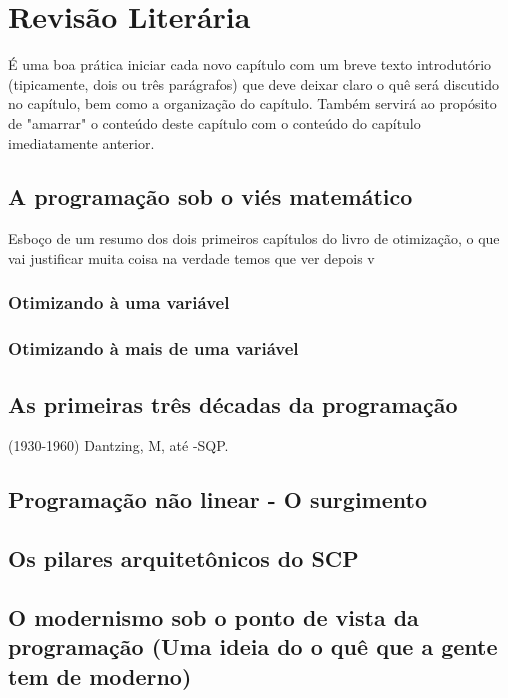
\chapter{\larger Revisão Literária}
\label{chap:fundamentacaoTeorica}

É uma boa prática iniciar cada novo capítulo com um breve texto introdutório (tipicamente, dois ou três parágrafos) que deve deixar claro o quê será discutido no capítulo, bem como a organização do capítulo.
Também servirá ao propósito de "amarrar"{} o conteúdo deste capítulo com o conteúdo do capítulo imediatamente anterior.

\section{A programação sob o viés matemático}
Esboço de um resumo dos dois primeiros capítulos do livro de otimização, o que vai justificar muita coisa na verdade temos que ver depois v
\subsection{Otimizando à uma variável}
\subsection{Otimizando à mais de uma variável}


\section{As primeiras três décadas da programação}
(1930-1960)
Dantzing, M, até -SQP.
\section{Programação não linear - O surgimento}
\section{Os pilares arquitetônicos do SCP}
\section{O modernismo sob o ponto de vista da programação (Uma ideia do o quê que a gente tem de moderno)}
